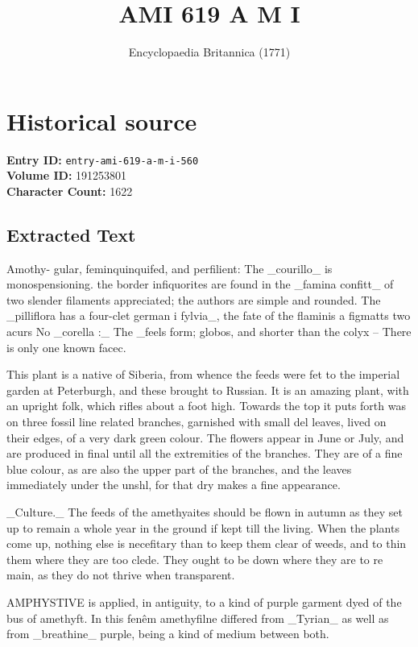 \documentclass{article}
\title{AMI  619 A M I}
\date{Encyclopaedia Britannica (1771)}
\begin{document}
\maketitle

\section*{Historical source}
\textbf{Entry ID:} \texttt{entry-ami-619-a-m-i-560} \\
\textbf{Volume ID:} 191253801 \\
\textbf{Character Count:} 1622

\subsection*{Extracted Text}
Amothy- gular, feminquinquifed, and perfilient: The \_courillo\_ is monospensioning. the border infiquorites are found in the \_famina confitt\_ of two slender filaments appreciated; the authors are simple and rounded. The \_pilliflora has a four-clet german i fylvia\_, the fate of the flaminis a figmatts two acurs No \_corella :\_ The \_feels form; globos, and shorter than the colyx – There is only one known facec.

This plant is a native of Siberia, from whence the feeds were fet to the imperial garden at Peterburgh, and these brought to Russian. It is an amazing plant, with an upright folk, which rifles about a foot high. Towards the top it puts forth was on three fossil line related branches, garnished with small del leaves, lived on their edges, of a very dark green colour. The flowers appear in June or July, and are produced in final until all the extremities of the branches. They are of a fine blue colour, as are also the upper part of the branches, and the leaves immediately under the unshl, for that dry makes a fine appearance.

\_Culture.\_ The feeds of the amethyaites should be flown in autumn as they set up to remain a whole year in the ground if kept till the living. When the plants come up, nothing else is necefitary than to keep them clear of weeds, and to thin them where they are too clede. They ought to be down where they are to re main, as they do not thrive when transparent.

AMPHYSTIVE is applied, in antiguity, to a kind of purple garment dyed of the bus of amethyft. In this fenêm amethyfilne differed from \_Tyrian\_ as well as from \_breathine\_ purple, being a kind of medium between both.
\end{document}
